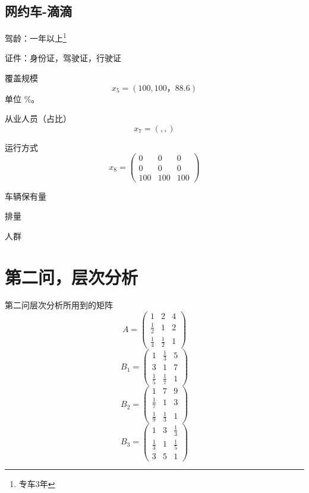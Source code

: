 \documentclass{ctexart}
\begin{document}
    \subsection{网约车-滴滴}
    驾龄：一年以上\footnote{专车3年}
    
    证件：身份证，驾驶证，行驶证
    
    覆盖规模
    $$x_5=(100,100，88.6)$$
    单位 \%。
    
    从业人员（占比）
    $$x_7=(,,)$$
    
    运行方式
    $$x_8=\left(\begin{array}{ccc}
    0 & 0 & 0\\
    0 & 0 & 0\\
    100 & 100 & 100
    \end{array}\right)$$
    
    车辆保有量
    
    排量
    
    人群
    
    \section{第二问，层次分析}
    \label{sec:q2}
    第二问层次分析所用到的矩阵
    $$A=\left(\begin{array}{ccc}
    1            &  2            &  4      \\
    \frac{1}{2}  &  1            &  2      \\
    \frac{1}{4}  &  \frac{1}{2}  &  1     
    \end{array}\right)$$
    $$B_1=\left(\begin{array}{ccc}
    1            &  \frac{1}{3}  &  5      \\
    3            &  1            &  7      \\
    \frac{1}{5}  & \frac{1}{7}   &  1      
    \end{array}\right)$$
    $$B_2=\left(\begin{array}{ccc}
    1           & 7           & 9 \\
    \frac{1}{7} & 1           & 3 \\
    \frac{1}{9} & \frac{1}{3} & 1
    \end{array}\right)$$
    $$B_3=\left(\begin{array}{ccc}
    1           & 3 & \frac{1}{3} \\
    \frac{1}{3} & 1 & \frac{1}{5} \\
    3           & 5 & 1
    \end{array}\right)$$
    
\end{document}
